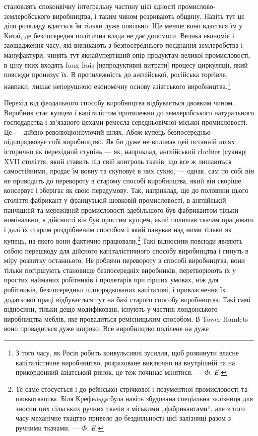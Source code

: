 \parcont{}  %
становлять споконвічну інтегральну частину цієї єдності промислово-землеробського
виробництва, і таким чином розривають
общину. Навіть тут це діло розкладу вдається їм тільки дуже
повільно. Ще менше воно вдається їм у Китаї, де безпосередня
політична влада не дає допомоги. Велика економія і заощадження
часу, які виникають з безпосереднього поєднання землеробства
і мануфактури, чинять тут якнайупертіший опір продуктам
великої промисловості, в ціну яких входять faux frais [непродуктивні
витрати] процесу циркуляції, який повсюди пронизує
їх. В протилежність до англійської, російська торгівля, навпаки,
лишає непорушною економічну основу азіатського виробництва.\footnote{
З того часу, як Росія робить конвульсивні зусилля, щоб розвинути
власне капіталістичне виробництво, розраховане виключно на внутрішній та
на прикордонний азіатський ринок, це теж починає мінятися. — \emph{Ф. Е.}
}

Перехід від феодального способу виробництва відбувається
двояким чином. Виробник стає купцем і капіталістом протилежно
до землеробського натурального господарства і зв’язаного цехами
ремесла середньовічної міської промисловості. Це — дійсно
революціонізуючий шлях. Абож купець безпосередньо підпорядковує
собі виробництво. Як би дуже не впливав цей останній
шлях історично як перехідний ступінь — як, наприклад, англійський
clothier [сукняр] XVII століття, який ставить під свій контроль
ткачів, що все ж лишаються самостійними, продає їм вовну
та скуповує в них сукно, — однак, сам по собі він не приводить
до перевороту в старому способі виробництва, який він скоріше
консервує і зберігає як свою передумову. Так, наприклад, ще
до половини цього століття фабрикант у французькій шовковій
промисловості, в англійській панчішній та мережівній промисловості
здебільшого був фабрикантом тільки номінально, в дійсності
він був простим купцем, який полишав ткачам працювати
і далі їх старим роздрібненим способом і який панував над ними
тільки як купець, на якого вони фактично працювали.\footnote{
Те саме стосується і до рейнської стрічкової і позументної промисловості
та шовкоткацтва. Біля Крефельда була навіть збудована спеціальна залізниця
для зносин цих сільських ручних ткачів з міськими „фабрикантами“, але
з того часу механічне ткацтво привело до бездіяльності цієї залізниці разом
з ручними ткачами. — \emph{Ф. Е.}
} Такі
відносини повсюди являють собою перешкоду для дійсного капіталістичного
способу виробництва і гинуть в міру розвитку останнього.
Не роблячи перевороту в способі виробництва, вони тільки
погіршують становище безпосередніх виробників, перетворюють
їх у простих найманих робітників і пролетарів при гірших умовах,
ніж для робітників, безпосередньо підпорядкованих капіталові,
і привласнення їх додаткової праці відбувається тут на базі старого
способу виробництва. Такі самі відносини, тільки дещо модифіковані,
існують у частині лондонського виробництва меблів,
яке провадиться ремісницьким способом. В Tower Hamlets воно
провадиться дуже широко. Все виробництво поділене на дуже
\parbreak{}  %
